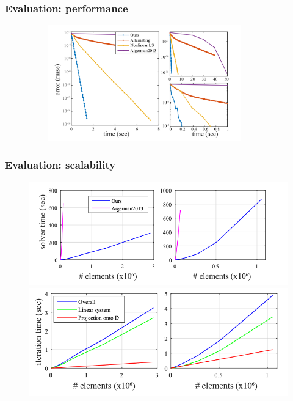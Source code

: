 \documentclass[serif,mathserif]{beamer}
\begin{document}
\begin{frame}
 \frametitle{Evaluation: performance}
 \begin{figure}
  \centering
  \includegraphics[width=10cm, height=5cm]{img/performance.png}
 \end{figure}
\end{frame}

\begin{frame}
 \frametitle{Evaluation: scalability}
 \begin{figure}[t]
  \centering  
  \begin{minipage}[t][0.9\textheight][s]{1\textwidth}
    \centering
    \includegraphics[scale=0.35]{img/sc0.png} 
    \vfill
    \includegraphics[scale=0.35]{img/sc1.png}
  \end{minipage}
 \end{figure}
\end{frame}
\end{document}

